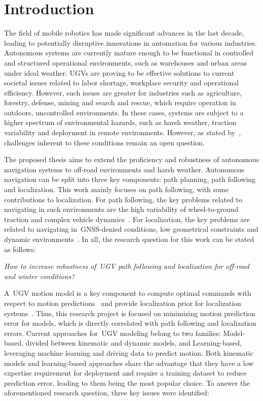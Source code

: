 \documentclass[12pt,letterpaper,oneside]{article}
\begin{document}
\makeCustomTitle
\thispagestyle{titlePage}


\section{Introduction}
\label{sec:introduction}

The field of mobile robotics has made significant advances in the last decade, leading to potentially disruptive innovations in automation for various industries.
Autonomous systems are currently mature enough to be functional in controlled and structured operational environments, such as warehouses and urban areas under ideal weather.
\Acp{UGV} are proving to be effective solutions to current societal issues related to labor shortage, workplace security and operational efficiency. 
However, such issues are greater for industries such as agriculture, forestry, defense, mining and search and rescue,  which require operation in outdoors, uncontrolled environments.
In these cases, systems are subject to a higher spectrum of environmental hazards, such as harsh weather, traction variability and deployment in remote environments.
However, as stated by~\citet{VanBrummelen2018}, challenges inherent to these conditions remain an open question.

The proposed thesis aims to extend the proficiency and robustness of autonomous navigation systems to off-road environments and harsh weather. 
Autonomous navigation can be split into three key components: path planning, path following and localization. 
This work mainly focuses on path following, with some contributions to localization.
For path following, the key problems related to navigating in such environments are the high variability of wheel-to-ground traction and complex vehicle dynamics~\citep{Baril2020}.
For localization, the key problems are related to navigating in~\ac{GNSS}-denied conditions, low geometrical constraints and dynamic environments~\citep{Baril2022}.
In all, the research question for this work can be stated as follows:

\begin{center}
	\emph{
		How to increase robustness of~\ac{UGV} path following and localization for off-road and winter conditions?
	}
\end{center}

A~\ac{UGV} motion model is a key component to compute optimal commands with respect to motion predictions~\citep{Brunke2022} and provide localization prior for localization systems~\citep{Dumbgen2023}. 
Thus, this research project is focused on minimizing motion prediction error for models, which is directly correlated with path following and localization errors. 
Current approaches for~\ac{UGV} modeling belong to two families: Model-based, divided between kinematic and dynamic models, and Learning-based, leveraging machine learning and driving data to predict motion.
Both kinematic models and learning-based approaches share the advantage that they have a low expertise requirement for deployment and require a training dataset to reduce prediction error, leading to them being the most popular choice.
To answer the aforementioned research question, three key issues were identified:
\end{document}
